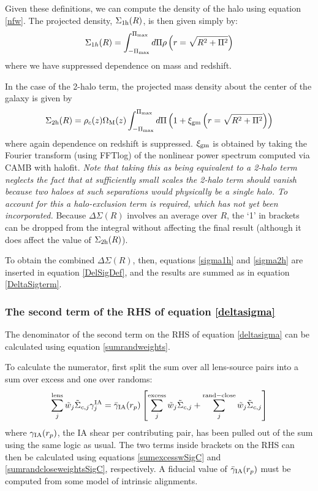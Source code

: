 \documentclass[onecolumn,amsmath,aps,fleqn, superscriptaddress]{revtex4}
\begin{document}
Given these definitions, we can compute the density of the halo using equation \ref{nfw}. The projected density, $\Sigma_{\rm 1h}(R)$, is then given simply by:
\begin{equation}
\Sigma_{1h}(R) = \int_{-\Pi_{\rm max}}^{\Pi_{\rm max}} d\Pi \rho\left(r = \sqrt{R^2 +\Pi^2}\right)
\label{sigma1h}
\end{equation}
where we have suppressed dependence on mass and redshift. 

In the case of the 2-halo term, the projected mass density about the center of the galaxy is given by
\begin{equation}
\Sigma_{\rm 2h}(R) = \rho_c(z) \Omega_{\rm M}(z) \int_{-\Pi_{\rm max}}^{\Pi_{\rm max}} d\Pi \left(1 + \xi_{\rm gm}\left(r = \sqrt{R^2 + \Pi^2}\right)\right)
\label{sigma2h}
\end{equation}
where again dependence on redshift is suppressed. $\xi_{\rm gm}$ is obtained by taking the Fourier transform (using FFTlog) of the nonlinear power spectrum computed via CAMB with halofit. {\it Note that taking this as being equivalent to a 2-halo term neglects the fact that at sufficiently small scales the 2-halo term should vanish because two haloes at such separations would physically be a single halo. To account for this a halo-exclusion term is required, which has not yet been incorporated.} Because $\Delta \Sigma (R)$ involves an average over $R$, the `1' in brackets can be dropped from the integral without affecting the final result (although it does affect the value of $\Sigma_{\rm 2h}(R)$). 

To obtain the combined $\Delta \Sigma(R)$, then, equations \ref{sigma1h} and \ref{sigma2h} are inserted in equation \ref{DelSigDef}, and the results are summed as in equation \ref{DeltaSigterm}.


\subsubsection*{The second term of the RHS of equation \ref{deltasigma}}
The denominator of the second term on the RHS of equation \ref{deltasigma} can be calculated using equation \ref{sumrandweights}. 

To calculate the numerator, first split the sum over all lens-source pairs into a sum over excess and one over randoms:
\begin{equation}
\sum\limits_{j}^{\rm lens} \tilde{w}_j \tilde{\Sigma}_{c,j} \gamma^{\rm IA}_j  = \bar{\gamma}_{\rm IA}(r_p)\left[\sum\limits_{j}^{\rm excess} \tilde{w}_j \tilde{\Sigma}_{c,j}  + \sum\limits_{j}^{\rm rand-close} \tilde{w}_j \tilde{\Sigma}_{c,j} \right]
\label{splitIA}
\end{equation}
where $\gamma_{\rm IA}(r_p)$, the IA shear per contributing pair, has been pulled out of the sum using the same logic as usual. The two terms inside brackets on the RHS can then be calculated using equations \ref{sumexcesswSigC} and \ref{sumrandcloseweightsSigC}, respectively. A fiducial value of $\bar{\gamma}_{\rm IA}(r_p)$ must be computed from some model of intrinsic alignments. 
\end{document}

